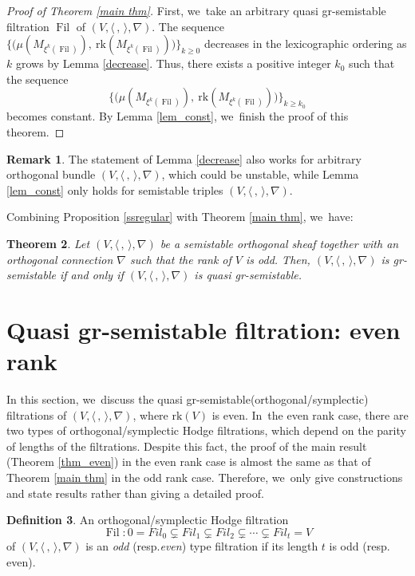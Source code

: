 \documentclass[11pt]{article}
\newcommand{\resp}{resp.\xspace}
\numberwithin{equation}{section}
\newcommand{\Fil}{\textit{Fil}}
\newcommand{\grsemistable}{gr\nobreakdash-semi\-stable\xspace}
\DeclareMathOperator{\Filt}{Fil}
\newcommand{\rk}{\mathrm{rk}}
\theoremstyle{plain}
\newtheorem{thm}{Theorem}[section]
\theoremstyle{definition}
\newtheorem{defn}[thm]{Definition}
\newtheorem{rem}[thm]{Remark}
\begin{document}
\begin{proof}[Proof of Theorem \ref{main thm}]
First, we~take an arbitrary quasi \grsemistable filtration $\Filt$ of $(V,\langle \,, \, \rangle,\nabla)$.
The sequence $\{\big(\mu(M_{\xi^k(\Filt)}),\ \rk(M_{\xi^k(\Filt)})\big)\}_{k\geq 0}$ decreases in the lexicographic ordering as $k$ grows by Lemma \ref{decrease}.
Thus, there exists a positive integer $k_0$ such that the sequence
\[
\{\big(\mu(M_{\xi^k(\Filt)}),\ \rk(M_{\xi^k(\Filt)})\big)\}_{k\geq k_0}
\]
becomes constant.
By Lemma \ref{lem_const}, we~finish the proof of this theorem.
\end{proof}

\begin{rem}
The statement of Lemma \ref{decrease} also works for arbitrary orthogonal bundle $(V, \langle \,, \, \rangle, \nabla)$, which could be unstable, while Lemma \ref{lem_const} only holds for semistable triples $(V, \langle \,, \, \rangle, \nabla)$.
\end{rem}

Combining Proposition \ref{ssregular} with Theorem \ref{main thm}, we~have:

\begin{thm}\label{thm_gr_and_quasi_gr_odd}
Let $(V,\langle \,, \, \rangle,\nabla)$ be a semistable orthogonal sheaf together with an orthogonal connection $\nabla$ such that the rank of $V$ is odd. Then, $(V,\langle \,, \, \rangle,\nabla)$ is \grsemistable if and only if $(V,\langle \,, \, \rangle,\nabla)$ is quasi \grsemistable.
\end{thm}

\section{Quasi \texorpdfstring{\protect\grsemistable}{grsemistable} filtration: even rank}\label{sect_even}
In this section, we~discuss the quasi \grsemistable (orthogonal/symplectic) filtrations of $(V, \langle \,, \, \rangle, \nabla)$, where $\rk(V)$ is even. In~the even rank case, there are two types of orthogonal/symplectic Hodge filtrations, which depend on the parity of lengths of the filtrations. Despite this fact, the proof of the main result (Theorem \ref{thm_even}) in the even rank case is almost the same as that of Theorem \ref{main thm} in the odd rank case. Therefore, we~only give constructions and state results rather than giving a detailed proof.

\begin{defn}
An orthogonal/symplectic Hodge filtration
\[
\Filt: 0=\Fil_0\subsetneq \Fil_1 \subsetneq \Fil_2 \subsetneq \cdots\subsetneq \Fil_t=V
\]
of $(V, \langle \,, \, \rangle, \nabla)$ is an \emph{odd} (\resp \emph{even}) type filtration if its length $t$ is odd (\resp even).
\end{defn}
\end{document}
